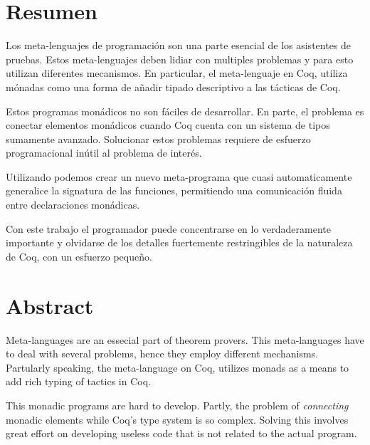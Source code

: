 \begingroup
\let\clearpage\relax
\let\cleardoublepage\relax
\let\cleardoublepage\relax



\chapter*{Resumen}

Los meta-lenguajes de programación son una parte esencial de los asistentes de pruebas. Estos meta-lenguajes deben lidiar con multiples problemas y para esto utilizan diferentes mecanismos. En particular, el meta-lenguaje \Mtac en Coq, utiliza mónadas como una forma de añadir tipado descriptivo a las tácticas de Coq.

Estos programas monádicos no son fáciles de desarrollar. En parte, el problema es conectar elementos monádicos cuando Coq cuenta con un sistema de tipos sumamente avanzado. Solucionar estos problemas requiere de esfuerzo programacional inútil al problema de interés.

Utilizando \mtac podemos crear un nuevo meta-programa que cuasi automaticamente generalice la signatura de las funciones, permitiendo una comunicación fluida entre declaraciones monádicas. %

Con este trabajo el programador puede concentrarse en lo verdaderamente importante y olvidarse de los detalles fuertemente restringibles de la naturaleza de Coq, con un esfuerzo pequeño.

\chapter*{Abstract}

Meta-languages are an essecial part of theorem provers. This meta-languages have to deal with several problems, hence they employ different mechanisms.
Partularly speaking, the meta-language \Mtac on Coq, utilizes monads as a means to add rich typing of tactics in Coq.

This monadic programs are hard to develop. Partly, the problem of \textit{connecting} monadic elements while Coq's type system is so complex. Solving this involves great effort on developing useless code that is not related to the actual program.

